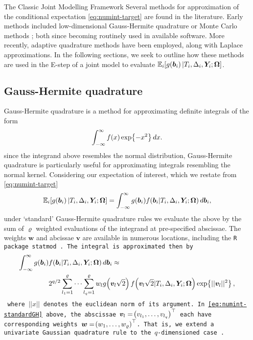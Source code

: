 \begin{chapter}{\label{cha:methods-classic}The Classic Joint Modelling Framework}
Several methods for approximation of the conditional expectation \eqref{eq:numint-target} are found in the literature. Early methods included low-dimensional Gauss-Hermite quadrature or Monte Carlo methods \citep{Wulfsohn97, Henderson2000}; both since becoming routinely used in available software. More recently, adaptive quadrature methods have been employed, along with Laplace approximations. In the following sections, we seek to outline how these methods are used in the E-step of a joint model to evaluate $\mathbb{E}_i\!\left[ g\!\left(\bm{b}_i\right)|T_i, \Delta_i, \bm{Y}_i; \bm{\mathrm{\Omega}}\right]$.
\subsection{Gauss-Hermite quadrature}\label{sec:numint-GH}
Gauss-Hermite quadrature is a method for approximating definite integrals of the form
\begin{equation*}
  \int_{-\infty}^\infty f(x)\exp\!\left\{-x^2\right\} dx.
\end{equation*}
since the integrand above resembles the normal distribution, Gauss-Hermite quadrature is particularly useful for approximating integrals resembling the normal kernel. Considering our expectation of interest, which we restate from \eqref{eq:numint-target}
\begin{align*}
    \mathbb{E}_i\!\left[ g\!\left(\bm{b}_i\right)|T_i, \Delta_i, \bm{Y}_i; \bm{\mathrm{\Omega}}\right]=\int_{-\infty}^\infty g(\bm{b}_i) f\!\left(\bm{b}_i|T_i,\Delta_i, \bm{Y}_i;\bm{\mathrm{\Omega}}\right) d\bm{b}_i,
\end{align*}
under `standard' Gauss-Hermite quadrature rules we evaluate the above by the sum of $\varrho$ weighted evaluations of the integrand at pre-specified abscissae. The weights $\bm{w}$ and abcissae $\bm{v}$ are available in numerous locations, including the \tt{R} package \tt{statmod} \citep{quadrature}. The integral is approximated then by
\begin{align}
    \int_{-\infty}^\infty g\!\left(\bm{b}_i\right) &f\!\left(\bm{b}_i|T_i,\Delta_i,\bm{Y}_i;\bm{\mathrm{\Omega}}\right) d\bm{b}_i \approx \nonumber\\
    & 2^{q/2}\sum_{l_1=1}^\varrho\dots\sum_{l_q=1}^\varrho w_l g\!\left( \bm{v}_l\sqrt{2}\right) f\!\left( \bm{v}_l\sqrt{2}|T_i,\Delta_i,\bm{Y}_i;\bm{\mathrm{\Omega}}\right)\exp\!\left\{||\bm{v}_l||^2\right\},
\label{eq:numint-standardGH}
\end{align}
where $||x||$ denotes the euclidean norm of its argument. In \eqref{eq:numint-standardGH} above, the abscissae $\bm{v}_l=\!\left( v_{l_1}, \dots, v_{l_q}\right)^\top$ each have corresponding weights $\bm{w}=\!\left( w_1,\dots,w_\varrho\right)^\top$. That is, we extend a univariate Gaussian quadrature rule to the $q$-dimensioned case \citep{RizopoulosJMbook}.


\end{chapter}
